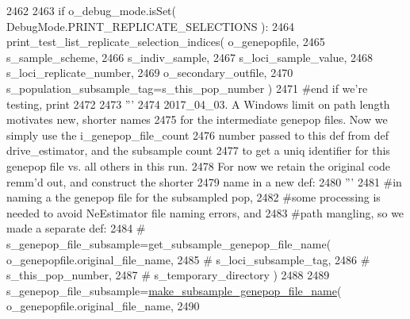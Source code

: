 \begin{DoxyCode}
2462 
2463                 \textcolor{keywordflow}{if} o\_debug\_mode.isSet( DebugMode.PRINT\_REPLICATE\_SELECTIONS ):
2464                     print\_test\_list\_replicate\_selection\_indices( o\_genepopfile, 
2465                                             s\_sample\_scheme,    
2466                                             s\_indiv\_sample, 
2467                                             s\_loci\_sample\_value,
2468                                             s\_loci\_replicate\_number,
2469                                             o\_secondary\_outfile, 
2470                                             s\_population\_subsample\_tag=s\_this\_pop\_number )
2471                 \textcolor{comment}{#end if we're testing, print }
2472 
2473                 \textcolor{stringliteral}{'''}
2474 \textcolor{stringliteral}{                2017\_04\_03.  A Windows limit on path length motivates new, shorter names}
2475 \textcolor{stringliteral}{                for the intermediate genepop files.  Now we simply use the i\_genepop\_file\_count}
2476 \textcolor{stringliteral}{                number passed to this def from def drive\_estimator, and the subsample count}
2477 \textcolor{stringliteral}{                to get a uniq identifier for this genepop file vs. all others in this run.}
2478 \textcolor{stringliteral}{                For now we retain the original code remm'd out, and construct the shorter}
2479 \textcolor{stringliteral}{                name in a new def:}
2480 \textcolor{stringliteral}{                '''}
2481                 \textcolor{comment}{#in naming a the genepop file for the subsampled pop,}
2482                 \textcolor{comment}{#some processing is needed to avoid NeEstimator file naming errors, and}
2483                 \textcolor{comment}{#path mangling, so we made a separate def:}
2484 \textcolor{comment}{#               s\_genepop\_file\_subsample=get\_subsample\_genepop\_file\_name( o\_genepopfile.original\_file\_name,
       }
2485 \textcolor{comment}{#                                                       s\_loci\_subsample\_tag, }
2486 \textcolor{comment}{#                                                       s\_this\_pop\_number,}
2487 \textcolor{comment}{#                                                       s\_temporary\_directory )}
2488                 
2489                 s\_genepop\_file\_subsample=\hyperlink{namespacenegui_1_1pgdriveneestimator_a9c650be4ed8ae5fa5e599523c22273bd}{make\_subsample\_genepop\_file\_name}( 
      o\_genepopfile.original\_file\_name,
2490                                                                                             

\end{DoxyCode}
